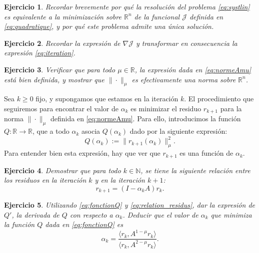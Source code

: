 \documentclass[11pt]{report}
\newtheorem{ex}{Ejercicio}
\newcommand{\R}{\mathbb{R}}
\begin{document}
\begin{ex}
Recordar brevemente por qué la resolución del problema \eqref{eq:systlin} es equivalente a la minimización sobre $\R^n$ de la funcional $\mathcal{J}$ definida en \eqref{eq:quadratique}, y por qué este problema admite una única solución.
\end{ex}

\begin{ex}
Recordar la expresión de $\nabla \mathcal{J}$ y transformar en consecuencia la expresión \eqref{eq:iteration}.
\end{ex}

\begin{ex}
Verificar que para todo $\mu \in \R$, la expresión dada en \eqref{eq:normeAmu} está bien definida, y mostrar que $\| \cdot \|_{\mu}$ es efectivamente una norma sobre $\R^n$.
\end{ex}

Sea $k \geq 0$ fijo, y supongamos que estamos en la iteración $k$.
El procedimiento que seguiremos para encontrar el valor de $\alpha_k$ es minimizar el residuo $r_{k+1}$ para la norma $\| \cdot \|_{\mu}$ definida en \eqref{eq:normeAmu}. Para ello, introducimos la función $Q : \R \to \R$, que a todo $\alpha_k$ asocia $Q(\alpha_k)$ dado por la siguiente expresión:
\begin{equation}
Q(\alpha_k) := \| r_{k+1} (\alpha_k) \|^2_{\mu}.
\label{eq:fonctionQ}
\end{equation}
Para entender bien esta expresión, hay que ver que $r_{k+1}$ es una función de $\alpha_k$.

\begin{ex}
Demostrar que para todo $k \in \mathbb{N}$, se tiene la siguiente relación entre los residuos en la iteración $k$ y en la iteración $k+1$:
\begin{equation}
r_{k+1} = (I - \alpha_k A) r_k.
\label{eq:relation_residus}
\end{equation}
\end{ex}

\begin{ex}
Utilizando \eqref{eq:fonctionQ} y \eqref{eq:relation_residus}, dar la expresión de $Q'$, la derivada de $Q$ con respecto a $\alpha_k$. Deducir que el valor de $\alpha_k$ que minimiza la función $Q$ dada en \eqref{eq:fonctionQ} es
\begin{equation}
\alpha_k = \frac{\langle r_k, A^{1-\mu} r_k \rangle}{\langle r_k, A^{2-\mu} r_k \rangle}.
\label{eq:alphakopt}
\end{equation}
\end{ex}
\end{document}
